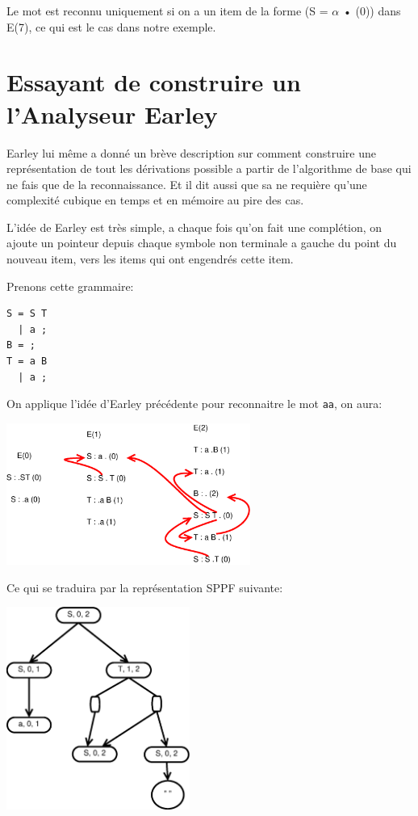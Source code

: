 \documentclass[10pt]{report}
\begin{document}
Le mot est reconnu uniquement si on a un item de la forme (S = $\alpha$ • (0)) dans E(7), ce qui est le cas dans notre exemple.

\section{Essayant de construire un l'Analyseur Earley}
Earley lui même a donné un brève description sur comment construire une représentation de tout les dérivations possible a partir de l'algorithme de base qui ne fais que de la reconnaissance. Et il dit aussi que sa ne requière qu'une complexité cubique en temps et en mémoire au pire des cas.

L'idée de Earley est très simple, a chaque fois qu'on fait une complétion, on ajoute un pointeur depuis chaque symbole non terminale a gauche du point du nouveau item, vers les items qui ont engendrés cette item.

Prenons cette grammaire:
\begin{lstlisting}
S = S T 
  | a ;
B = ;
T = a B 
  | a ;
\end{lstlisting}
On applique l'idée d'Earley précédente pour reconnaitre le mot \lstinline|aa|, on aura:

\includegraphics[width=8cm]{Diagramme1.eps}

Ce qui se traduira par la représentation SPPF suivante:

\includegraphics[width=6cm]{Diagramme3.eps}
\end{document}
